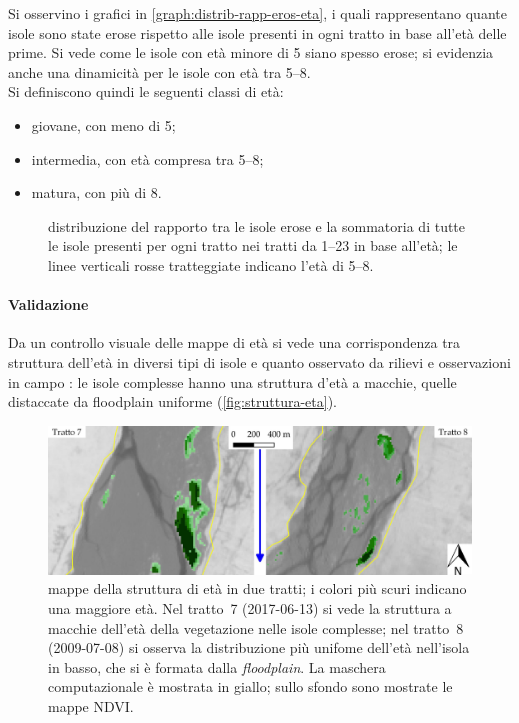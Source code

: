 \medskip
Si osservino i grafici in \vref{graph:distrib-rapp-eros-eta}, i quali rappresentano quante isole sono state erose rispetto alle isole presenti in ogni tratto in base all'età delle prime.
Si vede come le isole con età minore di \SI{5}{\anni} siano spesso erose; si evidenzia anche una dinamicità per le isole con età tra \SIrange[range-phrase={ e }]{5}{8}{\anni}. 
\\
Si definiscono quindi le seguenti classi di età:
%
\begin{itemize}
	\item giovane, con meno di \SI{5}{\anni};
	\item intermedia, con età compresa tra \SIrange[range-phrase={ e }]{5}{8}{\anni};
	\item matura, con più di \SI{8}{\anni}.
\end{itemize}
%
\begin{figure}
	\centering
	
	\caption[distribuzione del rapporto tra isole erose e la somma delle isole presenti]{distribuzione del rapporto tra le isole erose e la sommatoria di tutte le isole presenti per ogni tratto nei tratti da \numrange[range-phrase={ a }, mode=text]{1}{23} in base all'età; le linee verticali rosse tratteggiate indicano l'età di \SIrange[range-phrase={ e }]{5}{8}{\anni}.}
	\label{graph:distrib-rapp-eros-eta}
\end{figure}

\paragraph{Validazione}
Da un controllo visuale delle mappe di età si vede una corrispondenza tra struttura dell'età in diversi tipi di isole e quanto osservato da rilievi e osservazioni in campo : le isole complesse hanno una struttura d'età a macchie, quelle distaccate da floodplain uniforme (\vref{fig:struttura-eta}).
%
\begin{figure}
	\centering
	\includegraphics[width = \textwidth]{files/struttura_eta.jpeg}
	\caption[mappe della struttura di età in due tratti]{mappe della struttura di età in due tratti; i colori più scuri indicano una maggiore età.
		Nel tratto~7 (2017-06-13) si vede la struttura a macchie dell'età della vegetazione nelle isole complesse;
		nel tratto~8 (2009-07-08) si osserva la distribuzione più unifome dell'età nell'isola in basso, che si è formata dalla \emph{floodplain}.
		La maschera computazionale è mostrata in giallo; sullo sfondo sono mostrate le mappe NDVI.}
	\label{fig:struttura-eta}
\end{figure}
%

